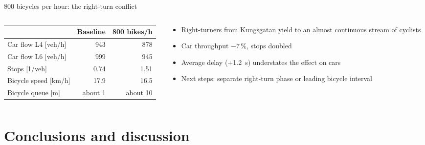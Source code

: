 \documentclass[aspectratio=169,10pt]{beamer}
\newcommand{\hl}[1]{\textcolor{accent}{\textbf{#1}}}
\begin{document}
\begin{frame}{800 bicycles per hour: the right-turn conflict}
\begin{columns}[T]
\begin{column}{0.48\textwidth}
\footnotesize
\begin{tabular}{lrr}
\toprule
 & \textbf{Baseline} & \textbf{800 bikes/h}\\
\midrule
Car flow L4 [veh/h] & 943 & 878\\
Car flow L6 [veh/h] & 999 & 945\\
Stops [1/veh] & 0.74 & 1.51\\
Bicycle speed [km/h] & 17.9 & 16.5\\
Bicycle queue [m] & about 1 & about 10\\
\bottomrule
\end{tabular}
\end{column}
\begin{column}{0.48\textwidth}
\small
\begin{itemize}\setlength{\itemsep}{5pt}
  \item Right-turners from Kungsgatan yield to an almost continuous stream of cyclists
  \item Car throughput \hl{$-7\,\%$}, stops doubled
  \item Average delay (+1.2~s) understates the effect on cars
  \item Next steps: separate right-turn phase or leading bicycle interval
\end{itemize}
\end{column}
\end{columns}
\end{frame}

\section{Conclusions and discussion}
\end{document}
